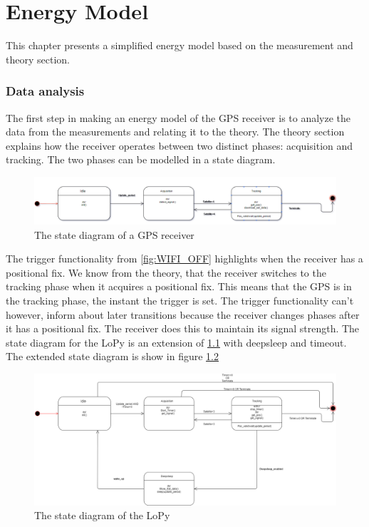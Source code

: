  \chapter{Energy Model}
 This chapter presents a simplified energy model based on the measurement and theory section. 
 \subsection{Data analysis}
 The first step in making an energy model of the GPS receiver is to analyze the data from the measurements and relating it to the theory. The theory section explains how the receiver operates between two distinct phases: acquisition and tracking. The two phases can be modelled in a state diagram. 
 
 
\begin{figure}[H]
\centering
\includegraphics[width=16 cm]{Project_Report/Images/gps_basics.PNG}
\caption{The state diagram of a GPS receiver}
\label{fig:GPS reciever}
\end{figure}
 
 The trigger functionality from \ref{fig:WIFI_OFF} highlights when the receiver has a positional fix. We know from the theory, that the receiver switches to the tracking phase when it acquires a positional fix. This means that the GPS is in the tracking phase, the instant the trigger is set. The trigger functionality can't however, inform about later transitions because the receiver changes phases after it has a positional fix. The receiver does this to maintain its signal strength. The state diagram for the LoPy is an extension of \ref{fig:GPS reciever} with deepsleep and timeout. The extended state diagram is show in figure \ref{fig:GPS energymodel}
 
\begin{figure}[h]
\centering
\includegraphics[width=15 cm]{Project_Report/Images/Energymodel.png}
\caption{The state diagram of the LoPy}
\label{fig:GPS energymodel}
\end{figure}
 

